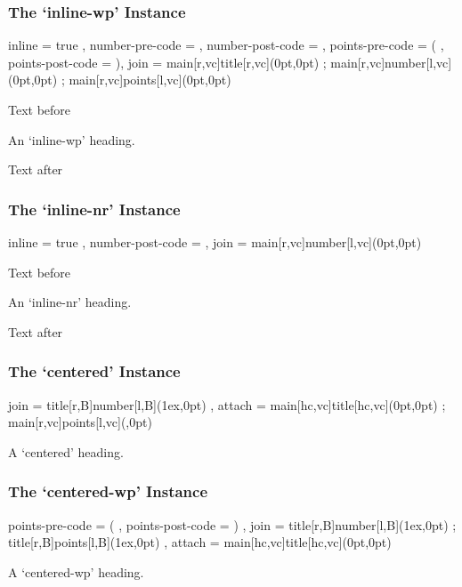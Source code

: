 \documentclass[DIV10,toc=index,toc=bib,numbers=noendperiod]{cnpkgdoc}
\begin{document}
\subsubsection{The `inline-wp' Instance}
\begin{beispiel}
  {
    inline           = true ,
    number-pre-code  = \space ,
    number-post-code = \space ,
    points-pre-code  = ( ,
    points-post-code = )\space ,
    join             =
      {
        main[r,vc]title[r,vc](0pt,0pt) ;
        main[r,vc]number[l,vc](0pt,0pt) ;
        main[r,vc]points[l,vc](0pt,0pt)
      }
  }
\end{beispiel}
Text before
\begin{question}{1}
 An `inline-wp' heading. \sample
\end{question}
 Text after

\subsubsection{The `inline-nr' Instance}
\begin{beispiel}
  {
    inline           = true ,
    number-post-code = \space ,
    join             = { main[r,vc]number[l,vc](0pt,0pt) }
  }
\end{beispiel}
Text before
\begin{question}{1}
 An `inline-nr' heading. \sample
\end{question}
 Text after

\subsubsection{The `centered' Instance}
\begin{beispiel}
  {
    join             = { title[r,B]number[l,B](1ex,0pt) } ,
    attach           =
      {
        main[hc,vc]title[hc,vc](0pt,0pt) ;
        main[r,vc]points[l,vc](\marginparsep,0pt)
      }
  }
\end{beispiel}
\begin{question}{1}
 A `centered' heading. \sample
\end{question}

\subsubsection{The `centered-wp' Instance}
\begin{beispiel}
  {
    points-pre-code  = ( ,
    points-post-code = ) ,
    join             =
      {
        title[r,B]number[l,B](1ex,0pt) ;
        title[r,B]points[l,B](1ex,0pt)
      } ,
    attach           = { main[hc,vc]title[hc,vc](0pt,0pt) }
  }
\end{beispiel}
\begin{question}{1}
 A `centered-wp' heading. \sample
\end{question}
\end{document}
